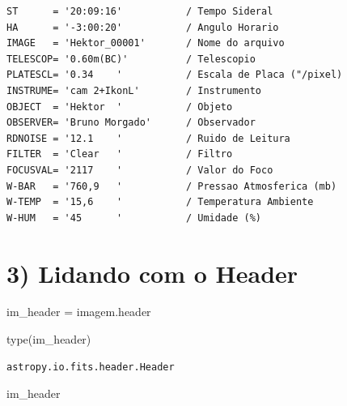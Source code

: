\documentclass[
  letterpaper,
  DIV=11,
  numbers=noendperiod]{scrreprt}
\newenvironment{Shaded}{\begin{snugshade}}{\end{snugshade}}
\newcommand{\BuiltInTok}[1]{\textcolor[rgb]{0.00,0.23,0.31}{#1}}
\newcommand{\NormalTok}[1]{\textcolor[rgb]{0.00,0.23,0.31}{#1}}
\newcommand{\OperatorTok}[1]{\textcolor[rgb]{0.37,0.37,0.37}{#1}}
\begin{document}
\begin{verbatim}
ST      = '20:09:16'           / Tempo Sideral                                  
HA      = '-3:00:20'           / Angulo Horario                                 
IMAGE   = 'Hektor_00001'       / Nome do arquivo                                
TELESCOP= '0.60m(BC)'          / Telescopio                                     
PLATESCL= '0.34    '           / Escala de Placa ("/pixel)                      
INSTRUME= 'cam 2+IkonL'        / Instrumento                                    
OBJECT  = 'Hektor  '           / Objeto                                         
OBSERVER= 'Bruno Morgado'      / Observador                                     
RDNOISE = '12.1    '           / Ruido de Leitura                               
FILTER  = 'Clear   '           / Filtro                                         
FOCUSVAL= '2117    '           / Valor do Foco                                  
W-BAR   = '760,9   '           / Pressao Atmosferica (mb)                       
W-TEMP  = '15,6    '           / Temperatura Ambiente                           
W-HUM   = '45      '           / Umidade (%)                                    
\end{verbatim}

\section{3) Lidando com o Header}\label{lidando-com-o-header}

\begin{Shaded}
\begin{Highlighting}[]
\NormalTok{im\_header }\OperatorTok{=}\NormalTok{ imagem.header}
\end{Highlighting}
\end{Shaded}

\begin{Shaded}
\begin{Highlighting}[]
\BuiltInTok{type}\NormalTok{(im\_header)}
\end{Highlighting}
\end{Shaded}

\begin{verbatim}
astropy.io.fits.header.Header
\end{verbatim}

\begin{Shaded}
\begin{Highlighting}[]
\NormalTok{im\_header}
\end{Highlighting}
\end{Shaded}
\end{document}
